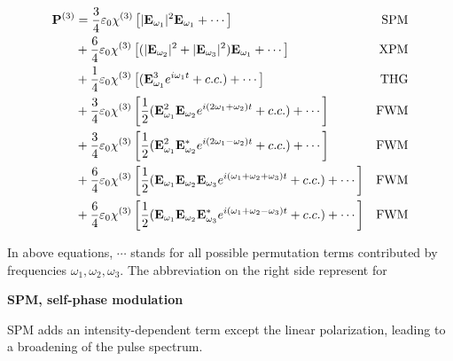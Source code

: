 \begin{align}
  \vb{P}^{(3)} 
  & = \frac{3}{4} \varepsilon_0 \chi^{(3)} \left[| \vb{E}_{\omega_1} |^2 \vb{E}_{\omega_1} + \cdots\right] & \mathrm{SPM} \\
  & + \frac{6}{4} \varepsilon_0 \chi^{(3)} \left[(| \vb{E}_{\omega_2} |^2 + |\vb{E}_{\omega_3} |^2) \vb{E}_{\omega_1} + \cdots \right] & \mathrm{XPM} \\
  & + \frac{1}{4} \varepsilon_0 \chi^{(3)} \left[(\vb{E}_{\omega_1}^3 e^{i \omega_1 t} + c.c.) + \cdots\right] & \mathrm{THG} \\
  & + \frac{3}{4} \varepsilon_0 \chi^{(3)} \left[ \frac{1}{2} (\vb{E}_{\omega_1}^2 \vb{E}_{\omega_2} e^{i (2 \omega_1 + \omega_2) t} + c.c.) + \cdots \right] & \mathrm{FWM} \label{eq:fwm1} \\ 
  & + \frac{3}{4} \varepsilon_0 \chi^{(3)} \left[ \frac{1}{2} (\vb{E}_{\omega_1}^2 \vb{E}^{\ast}_{\omega_2} e^{i (2 \omega_1 - \omega_2) t} + c.c.) + \cdots \right] & \mathrm{FWM} \label{eq:fwm2} \\ 
  & + \frac{6}{4} \varepsilon_0 \chi^{(3)} \left[ \frac{1}{2} (\vb{E}_{\omega_1} \vb{E}_{\omega_2} \vb{E}_{\omega_3} e^{i (\omega_1 + \omega_2 + \omega_3) t} + c.c.) + \cdots \right] & \mathrm{FWM}  \label{eq:fwm3} \\
  & + \frac{6}{4} \varepsilon_0 \chi^{(3)} \left[ \frac{1}{2} (\vb{E}_{\omega_1} \vb{E}_{\omega_2} \vb{E}^{\ast}_{\omega_3} e^{i (\omega_1 + \omega_2 - \omega_3) t} + c.c.) + \cdots \right] & \mathrm{FWM} \label{eq:fwm4}
\end{align}

In above equations, $\cdots$ stands for all possible permutation terms contributed by frequencies $\omega_1, \omega_2, \omega_3$. The abbreviation on the right side represent for 

\bigskip
\noindent\textbf{SPM, self-phase modulation}

SPM adds an intensity-dependent term except the linear polarization, leading to a broadening of the pulse spectrum.

